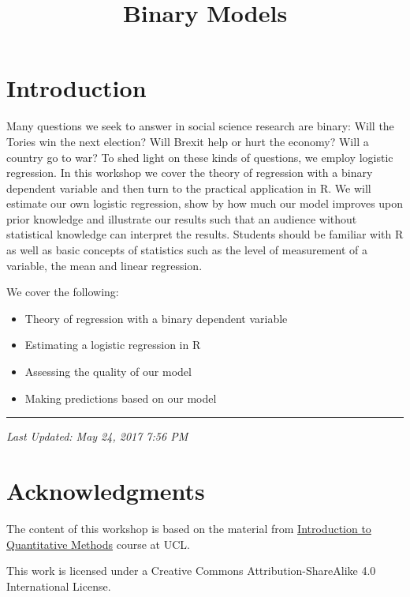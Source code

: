 \documentclass[]{article}
\title{Binary Models}
\author{}
\date{}
\providecommand{\tightlist}{%
  \setlength{\itemsep}{0pt}\setlength{\parskip}{0pt}}
\theoremstyle{definition}
\theoremstyle{definition}
\theoremstyle{remark}
\begin{document}
\maketitle

{
\setcounter{tocdepth}{2}
\tableofcontents
}
\section{Introduction}\label{introduction}

Many questions we seek to answer in social science research are binary:
Will the Tories win the next election? Will Brexit help or hurt the
economy? Will a country go to war? To shed light on these kinds of
questions, we employ logistic regression. In this workshop we cover the
theory of regression with a binary dependent variable and then turn to
the practical application in R. We will estimate our own logistic
regression, show by how much our model improves upon prior knowledge and
illustrate our results such that an audience without statistical
knowledge can interpret the results. Students should be familiar with R
as well as basic concepts of statistics such as the level of measurement
of a variable, the mean and linear regression.

We cover the following:

\begin{itemize}
\tightlist
\item
  Theory of regression with a binary dependent variable
\item
  Estimating a logistic regression in R
\item
  Assessing the quality of our model
\item
  Making predictions based on our model
\end{itemize}

\begin{center}\rule{0.5\linewidth}{\linethickness}\end{center}

\emph{Last Updated: May 24, 2017 7:56 PM}

\section{Acknowledgments}\label{acknowledgments}

The content of this workshop is based on the material from
\href{https://uclspp.github.io/PUBLG100}{Introduction to Quantitative
Methods} course at UCL.

This work is licensed under a Creative Commons Attribution-ShareAlike
4.0 International License.
\end{document}
